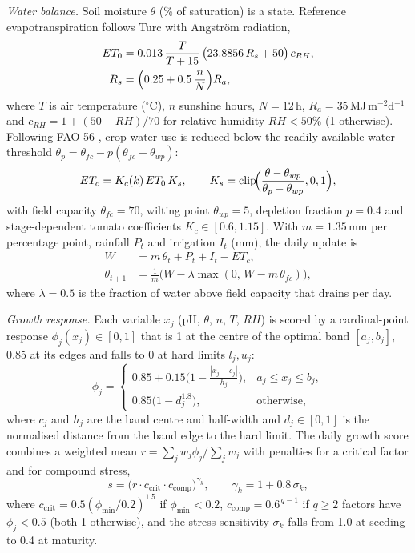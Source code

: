\documentclass[conference]{IEEEtran}
\newcommand{\clip}{\operatorname{clip}}
\begin{document}
\textit{Water balance.} Soil moisture $\theta$ (\% of saturation) is a state. Reference
evapotranspiration follows Turc \cite{turc1961evaluation} with Angstr\"om radiation,
\begin{equation}
\begin{aligned}
ET_0 &= 0.013\,\frac{T}{T+15}\,\bigl(23.8856\,R_s + 50\bigr)\,c_{RH},\\
R_s &= \Bigl(0.25 + 0.5\,\frac{n}{N}\Bigr)R_a,
\end{aligned}
\label{eq:et0}
\end{equation}
where $T$ is air temperature ($^\circ$C), $n$ sunshine hours, $N=12$\,h, $R_a=35$\,MJ\,m$^{-2}$d$^{-1}$
and $c_{RH}=1+(50-RH)/70$ for relative humidity $RH<50\%$ (1 otherwise). Following FAO-56
\cite{allen1998fao56}, crop water use is reduced below the readily available water threshold
$\theta_p=\theta_{fc}-p(\theta_{fc}-\theta_{wp})$:
\begin{equation}
ET_c = K_c(k)\,ET_0\,K_s,\qquad K_s=\clip\!\Bigl(\frac{\theta-\theta_{wp}}{\theta_p-\theta_{wp}},0,1\Bigr),
\label{eq:etc}
\end{equation}
with field capacity $\theta_{fc}=70$, wilting point $\theta_{wp}=5$, depletion fraction $p=0.4$ and
stage-dependent tomato coefficients $K_c\in[0.6,1.15]$. With $m=1.35$\,mm per percentage point,
rainfall $P_t$ and irrigation $I_t$ (mm), the daily update is
\begin{equation}
\begin{aligned}
W &= m\,\theta_t + P_t + I_t - ET_c,\\
\theta_{t+1} &= \tfrac{1}{m}\bigl(W - \lambda\max(0,\,W - m\,\theta_{fc})\bigr),
\end{aligned}
\label{eq:water}
\end{equation}
where $\lambda=0.5$ is the fraction of water above field capacity that drains per day.

\textit{Growth response.} Each variable $x_j$ (pH, $\theta$, $n$, $T$, $RH$) is scored by a
cardinal-point response $\phi_j(x_j)\in[0,1]$ that is 1 at the centre of the optimal band
$[a_j,b_j]$, 0.85 at its edges and falls to 0 at hard limits $l_j,u_j$:
\begin{equation}
\phi_j=\begin{cases}
0.85+0.15\bigl(1-\frac{|x_j-c_j|}{h_j}\bigr), & a_j\le x_j\le b_j,\\
0.85\bigl(1-d_j^{1.8}\bigr), & \text{otherwise},
\end{cases}
\label{eq:phi}
\end{equation}
where $c_j$ and $h_j$ are the band centre and half-width and $d_j\in[0,1]$ is the normalised
distance from the band edge to the hard limit. The daily growth score combines a weighted mean
$r=\sum_j w_j\phi_j/\sum_j w_j$ with penalties for a critical factor and for compound stress,
\begin{equation}
s=\bigl(r\cdot c_{\text{crit}}\cdot c_{\text{comp}}\bigr)^{\gamma_k},\qquad \gamma_k=1+0.8\,\sigma_k,
\label{eq:score}
\end{equation}
where $c_{\text{crit}}=0.5(\phi_{\min}/0.2)^{1.5}$ if $\phi_{\min}<0.2$, $c_{\text{comp}}=0.6^{\,q-1}$
if $q\ge2$ factors have $\phi_j<0.5$ (both 1 otherwise), and the stress sensitivity $\sigma_k$
falls from 1.0 at seeding to 0.4 at maturity.
\end{document}
